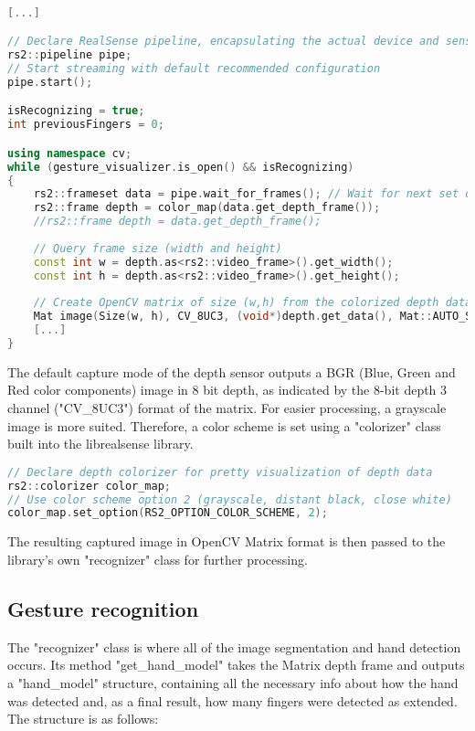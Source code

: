 \documentclass[BSA,Bachelor,english]{twbook}%
\begin{document}
\begin{lstlisting}[language=C++,name={RealSense image capture and conversion},label={rs:loop:1}]

[...]

// Declare RealSense pipeline, encapsulating the actual device and sensors
rs2::pipeline pipe;
// Start streaming with default recommended configuration
pipe.start();

isRecognizing = true;
int previousFingers = 0;

using namespace cv;
while (gesture_visualizer.is_open() && isRecognizing)
{
	rs2::frameset data = pipe.wait_for_frames(); // Wait for next set of frames from the camera
	rs2::frame depth = color_map(data.get_depth_frame());
	//rs2::frame depth = data.get_depth_frame();
	
	// Query frame size (width and height)
	const int w = depth.as<rs2::video_frame>().get_width();
	const int h = depth.as<rs2::video_frame>().get_height();
	
	// Create OpenCV matrix of size (w,h) from the colorized depth data
	Mat image(Size(w, h), CV_8UC3, (void*)depth.get_data(), Mat::AUTO_STEP);
	[...]    
}
\end{lstlisting}

The default capture mode of the depth sensor outputs a BGR (Blue, Green and Red color components) image in 8 bit depth, as indicated by the 8-bit depth 3 channel ("CV\_8UC3") format of the matrix. For easier processing, a grayscale image is more suited. Therefore, a color scheme is set using a "colorizer" class built into the librealsense library.

\begin{lstlisting}[language=C++,name={RealSense image colorizer},label={rs:init:1}]
// Declare depth colorizer for pretty visualization of depth data
rs2::colorizer color_map;
// Use color scheme option 2 (grayscale, distant black, close white)
color_map.set_option(RS2_OPTION_COLOR_SCHEME, 2);
\end{lstlisting}

The resulting captured image in OpenCV Matrix format is then passed to the library's own "recognizer" class for further processing.

\subsection{Gesture recognition}

The "recognizer" class is where all of the image segmentation and hand detection occurs. Its method "get\_hand\_model" takes the Matrix depth frame and outputs a "hand\_model" structure, containing all the necessary info about how the hand was detected and, as a final result, how many fingers were detected as extended. The structure is as follows:
\end{document}
